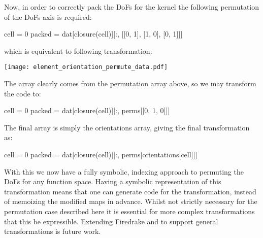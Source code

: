 \documentclass[thesis]{subfiles}
\begin{document}
Now, in order to correctly pack the DoFs for the kernel the following permutation of the DoFs axis is required:

\begin{pyinline}
  cell = 0
  packed = dat[closure(cell)][:, [[0, 1], [1, 0], [0, 1]]]
\end{pyinline}

\noindent
which is equivalent to following transformation:

\begin{center}
  \texttt{[image: element\_orientation\_permute\_data.pdf]}
\end{center}

The array \pycode{[[0, 1], [1, 0], [0, 1]]} clearly comes from the permutation array above, so we may transform the code to:

\begin{pyinline}
  cell = 0
  packed = dat[closure(cell)][:, perms[[0, 1, 0]]]
\end{pyinline}

The final array \pycode{[0, 1, 0]} is simply the orientations array, giving the final transformation as:

\begin{pyinline}
  cell = 0
  packed = dat[closure(cell)][:, perms[orientations[cell]]]
\end{pyinline}

With this we now have a fully symbolic, indexing approach to permuting the DoFs for any function space.
Having a symbolic representation of this transformation means that one can generate code for the transformation, instead of memoizing the modified maps in advance.
Whilst not strictly necessary for the permutation case described here it is essential for more complex transformations that this be expressible.
Extending Firedrake and  to support general transformations is future work.
\end{document}

